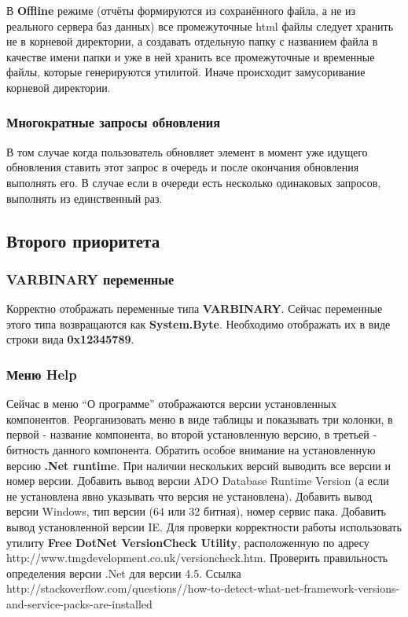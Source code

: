 В \textbf{Offline} режиме (отчёты формируются из сохранённого файла, а не из реального сервера баз
данных) все промежуточные html файлы следует хранить не в корневой директории, а создавать отдельную
папку с названием файла в качестве имени папки и уже в ней хранить все промежуточные и временные
файлы, которые генерируются утилитой. Иначе происходит замусоривание корневой директории.

\subsubsection{Многократные запросы обновления}

В том случае когда пользователь обновляет элемент в момент уже идущего обновления ставить этот
запрос в очередь и после окончания обновления выполнять его. В случае если в очереди есть несколько
одинаковых запросов, выполнять из единственный раз.

\subsection{Второго приоритета}

\subsubsection{VARBINARY переменные}

Корректно отображать переменные типа \textbf{VARBINARY}. Сейчас переменные этого типа возвращаются
как \textbf{System.Byte}. Необходимо отображать их в виде строки вида \textbf{0x12345789}.

\subsubsection{Меню Help}

Сейчас в меню ``О программе'' отображаются версии установленных компонентов. Реорганизовать меню в
виде таблицы и показывать три колонки, в первой - название компонента, во второй установленную
версию, в третьей - битность данного компонента. Обратить особое внимание на установленную версию
\textbf{.Net runtime}. При наличии нескольких версий выводить все версии и номер версии. Добавить
вывод версии ADO Database Runtime Version (а если не установлена явно указывать что версия не
установлена). Добавить вывод версии Windows, тип версии (64 или 32 битная), номер сервис пака.
Добавить вывод установленной версии IE. Для проверки корректности работы использовать утилиту
\textbf{Free DotNet VersionCheck Utility}, расположенную по адресу
http://www.tmgdevelopment.co.uk/versioncheck.htm. Проверить правильность определения версии .Net для
версии 4.5. Ссылка
http://stackoverflow.com/\-questions//\-how-to-detect-\-what-net-framework\--versions-and\--service-packs-are-installed

